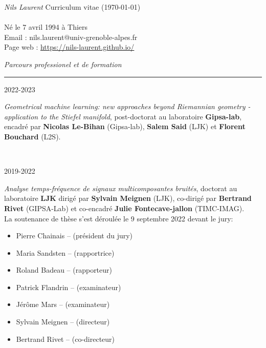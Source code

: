\documentclass[a4paper,10pt, french]{article}
\begin{document}
\noindent
\textit{\Large \color{Black} Nils Laurent} \hfill {Curriculum vitae (\today)}\\
\vspace{0mm}\\
Né le 7 avril 1994 à Thiers\\
Email : nils.laurent@univ-grenoble-alpes.fr\\
Page web : \url{https://nils-laurent.github.io/}\\
\vspace{5mm}

\noindent
\textit{\Large \color{MyGray} \hspace{5mm} Parcours professionel et de formation}
\vspace{2mm}
{\color{DefaultGray}\hrule height .1pt}
\vspace{4mm}

\noindent
\begin{minipage}{0.20\textwidth}
	\color{MyGray} 2022-2023
\end{minipage}
\hfill
\begin{minipage}{0.70\textwidth}
	\emph{Geometrical machine learning: new approaches beyond Riemannian geometry - application to the Stiefel manifold}, post-doctorat au laboratoire \textbf{Gipsa-lab}, encadré par \textbf{Nicolas Le-Bihan} (Gipsa-lab), \textbf{Salem Said} (LJK) et \textbf{Florent Bouchard} (L2S).
\end{minipage}\\
\vspace{2mm}

\noindent
\begin{minipage}{0.20\textwidth}
	\color{MyGray} 2019-2022
\end{minipage}
\hfill
\begin{minipage}{0.70\textwidth}
	\emph{Analyse temps-fréquence de signaux multicomposantes bruités}, doctorat au  laboratoire \textbf{LJK} dirigé par \textbf{Sylvain Meignen} (LJK), co-dirigé par \textbf{Bertrand Rivet} (GIPSA-Lab) et co-encadré \textbf{Julie Fontecave-jallon} (TIMC-IMAG).\\
	La soutenance de thèse s'est déroulée le 9 septembre 2022 devant le jury:
	\begin{itemize}
		\item[] Pierre Chainais -- (président du jury)
		\item[] Maria Sandsten -- (rapportrice)
		\item[] Roland Badeau -- (rapporteur)
		\item[] Patrick Flandrin -- (examinateur)
		\item[] Jérôme Mars -- (examinateur)
		\item[] Sylvain Meignen -- (directeur)
		\item[] Bertrand Rivet -- (co-directeur)
	\end{itemize}
\end{minipage}\\
\vspace{2mm}
\end{document}
